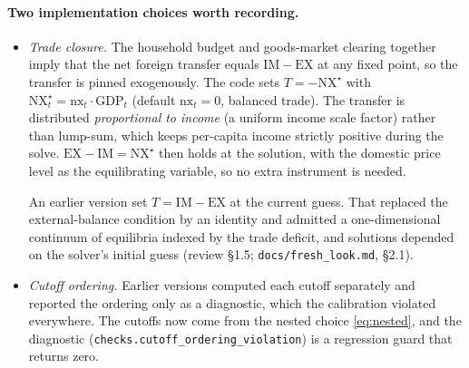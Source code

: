 \documentclass[11pt]{article}
\begin{document}
\paragraph{Two implementation choices worth recording.}
\begin{itemize}[leftmargin=1.5em]
\item \emph{Trade closure.} The household budget and goods-market clearing together imply
      that the net foreign transfer equals $\mathrm{IM}-\mathrm{EX}$ at any fixed point, so
      the transfer is pinned exogenously. The code sets $T=-\mathrm{NX}^{\star}$ with
      $\mathrm{NX}^{\star}_t=\mathrm{nx}_t\cdot\mathrm{GDP}_t$ (default $\mathrm{nx}_t=0$,
      balanced trade). The transfer is distributed \emph{proportional to income} (a uniform
      income scale factor) rather than lump-sum, which keeps per-capita income strictly
      positive during the solve. $\mathrm{EX}-\mathrm{IM}=\mathrm{NX}^{\star}$ then holds at
      the solution, with the domestic price level as the equilibrating variable, so no extra
      instrument is needed.

      An earlier version set $T=\mathrm{IM}-\mathrm{EX}$ at the current guess. That replaced
      the external-balance condition by an identity and admitted a one-dimensional continuum
      of equilibria indexed by the trade deficit, and solutions depended on the solver's
      initial guess (review \S1.5; \texttt{docs/fresh\_look.md}, \S2.1).
\item \emph{Cutoff ordering.} Earlier versions computed each cutoff separately and
      reported the ordering only as a diagnostic, which the calibration violated everywhere.
      The cutoffs now come from the nested choice \eqref{eq:nested}, and the diagnostic
      (\texttt{checks.cutoff\_ordering\_violation}) is a regression guard that returns zero.
\end{itemize}
\end{document}
